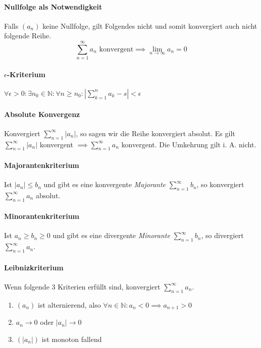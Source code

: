 \documentclass[a4paper, 9pt, DIV=24]{scrartcl}
\newcommand{\N}{\mathbb{N}}
\begin{document}
\paragraph{Nullfolge als Notwendigkeit}
Falls $(a_n)$ keine Nullfolge, gilt Folgendes nicht und somit konvergiert auch nicht folgende Reihe.
\[ \sum_{n=1}^\infty a_n \text{ konvergent} \implies \lim_{n \to \infty} a_n = 0 \]

\paragraph{$\epsilon$-Kriterium}
$\forall \epsilon > 0: \exists n_0 \in \N: \forall n \geq n_0: | \sum_{k=1}^n a_k - s | < \epsilon$

\paragraph{Absolute Konvergenz}
Konvergiert $\sum_{n=1}^\infty |a_n|$, so sagen wir die Reihe konvergiert absolut.
Es gilt $\sum_{n=1}^\infty |a_n|$ konvergent $ \implies \sum_{n=1}^\infty a_n$ konvergent.
Die Umkehrung gilt i. A. nicht.

\paragraph{Majorantenkriterium}
Ist $|a_n| \leq b_n$ und gibt es eine konvergente \emph{Majorante} $\sum_{n=1}^\infty b_n$, so konvergiert $\sum_{n=1}^\infty a_n$ absolut.

\paragraph{Minorantenkriterium}
Ist $a_n \geq b_n \geq 0$ und gibt es eine divergente \emph{Minorante} $\sum_{n=1}^\infty b_n$, so divergiert $\sum_{n=1}^\infty a_n$.

\paragraph{Leibnizkriterium}
Wenn folgende 3 Kriterien erfüllt sind, konvergiert $\sum_{n=1}^\infty a_n$.
\begin{enumerate}[label={(}\arabic*{)}]
  \item $(a_n)$ ist alternierend, also $\forall n\in\N: a_n < 0 \implies a_{n+1} > 0$
  \item $a_n \to 0$ oder $|a_n| \to 0$
  \item $(|a_n|)$ ist monoton fallend
\end{enumerate}
\end{document}
